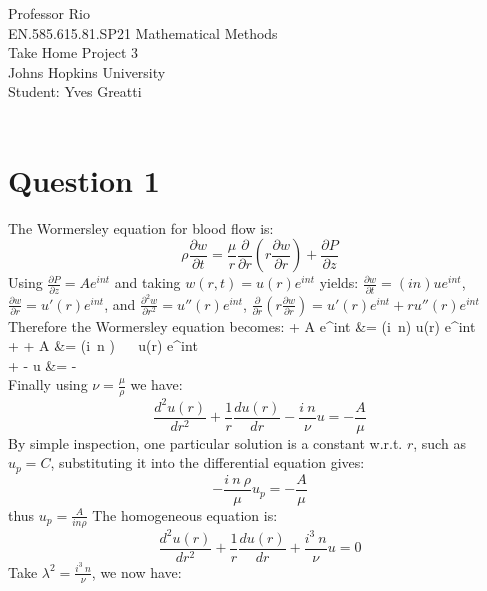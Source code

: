 \documentclass[12pt,twoside]{article}
\begin{document}
\noindent Professor Rio\\
EN.585.615.81.SP21 Mathematical Methods\\
Take Home Project 3\\
Johns Hopkins University\\
Student: Yves Greatti\\\

\section*{Question 1}
The Wormersley equation for blood flow is:
\[
	\rho \frac{\partial w}{\partial t} = \frac{\mu}{r} \frac{\partial}{\partial r}( r \frac{\partial w}{\partial r}) +\frac{\partial P}{\partial z} 
\]
Using $\frac{\partial P}{\partial z}  = A e^{int}$ and taking $w(r, t) = u(r) e^{int}$ yields: $\frac{\partial w}{\partial t} = (in) u e^{int}$,  
$\frac{\partial w}{\partial r} = u'(r) e^{int}$, and $\frac{\partial^2 w}{\partial r^2} = u''(r) e^{int}$, 
$\frac{\partial}{\partial r}( r \frac{\partial w}{\partial r}) = u'(r) e^{int} + r u''(r) e^{int}$
Therefore the Wormersley equation becomes:
\ba
	 	+  A e^{int}		&=	\rho (i~n) u(r) e^{int} \\
	\mu {} +   + A 			&= (i~n )~ \rho ~ u(r)  e^{int} \\
	 +   -  u	&= -   \mu {} \\
\ea
Finally using $\nu = \frac{\mu}{\rho}$ we have:
\[
	\frac{d^2 u(r)}{d r^2} + \frac{1}{r} \frac{d u(r)}{d r} - \frac{i~n}{\nu} u = - \frac{A}{\mu}
\]
By simple inspection, one particular solution is a constant w.r.t. $r$, such as $u_p = C$, substituting it into the differential equation gives:
\[
	- \frac{i~n~\rho}{\mu} u_p = - \frac{A}{\mu}
\]
thus $u_p = \frac{A}{in\rho}$
The homogeneous equation is:
\[
	\frac{d^2 u(r)}{d r^2} + \frac{1}{r} \frac{d u(r)}{d r} + \frac{i^3~n}{\nu} u = 0
\]
Take $\lambda^2 = \frac{i^3~n}{\nu}$, we now have:
\end{document}
